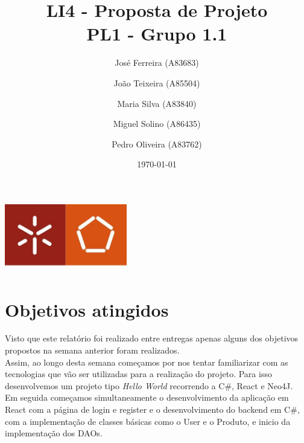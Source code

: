 \documentclass[a4paper]{report}
\begin{document}
\title{LI4 - Proposta de Projeto\\ 
\large PL1 - Grupo 1.1}
\author{José Ferreira (A83683) \and João Teixeira (A85504) \and Maria Silva
(A83840) \and Miguel Solino (A86435) \and Pedro Oliveira (A83762)}
\date{\today}

\begin{center}
    \begin{minipage}{0.75\linewidth}
        \centering
        \includegraphics[width=0.4\textwidth]{images/eng.jpeg}\par\vspace{1cm}
        \vspace{1.5cm}
        \href{https://www.uminho.pt/PT}
        {\color{black}{\scshape\LARGE Universidade do Minho}} \par
        \vspace{1cm}
        \href{https://www.di.uminho.pt/}
        {\color{black}{\scshape\Large Departamento de Informática}} \par
        \vspace{1.5cm}
        \maketitle
    \end{minipage}
\end{center}

\pagebreak
\chapter{Objetivos atingidos}
Visto que este relatório foi realizado entre entregas apenas alguns dos
objetivos propostos na semana anterior foram realizados. \\
Assim, ao longo desta semana começamos por nos tentar familiarizar com as
tecnologias que vão ser utilizadas para a realização do projeto. Para isso
desenvolvemos um projeto tipo \textit{Hello World} recorrendo a C\#, React e
Neo4J.\\
Em seguida começamos simultaneamente o desenvolvimento da aplicação em React com
a página de login e register e o desenvolvimento do backend em C\#, com a
implementação de classes básicas como o User e o Produto, e inicio da
implementação dos DAOs.
\end{document}
